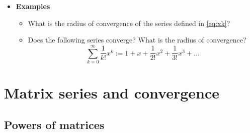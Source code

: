 \documentclass[12pt,a4paper]{article}
\begin{document}
\begin{itemize}
\item \textbf{Examples}
  \begin{itemize}
  \item What is the radius of convergence of the series defined in \eqref{eq:xk}?
  \item Does the following series converge? What is the radius of convergence?
    \begin{equation}\label{eq:ex}%
      \sum_{k=0}^{\infty} \frac{1}{k!}x^{k}
      := 1 + x + \frac{1}{2!}x^{2} + \frac{1}{3!}x^{3} + \ldots
    \end{equation}
  \end{itemize}

\end{itemize}

\section{Matrix series and convergence}

\subsection{Powers of matrices}
\end{document}

